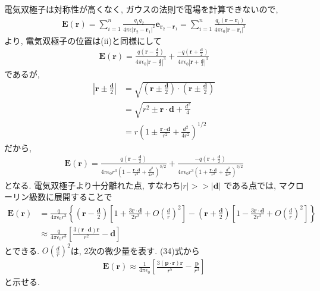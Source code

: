 \documentclass[a4paper,12pt]{jlreq}
\begin{document}
電気双極子は対称性が高くなく, ガウスの法則で電場を計算できないので, 
\begin{align}
  \bm{E}(\bm{r}) = \sum_{i = 1}^{n}\frac{q_1 q_2}{4\pi \epsilon \left|\bm{r}_2 - \bm{r}_1\right|^2} \bm{e}_{\bm{r}_2 - \bm{r}_1} = \sum_{i = 1}^{n} \frac{q_i (\bm{r} - \bm{r}_i)}{4\pi \epsilon_0 \left|\bm{r} - \bm{r}_i\right|^3}
\end{align}
より, 電気双極子の位置は(ii)と同様にして
\begin{align}
  \bm{E}(\bm{r}) = \frac{q\left(\bm{r} - \frac{\bm{d}}{2}\right)}{4\pi \epsilon_0 \left|\bm{r} - \frac{\bm{d}}{2}\right|^3} + \frac{-q\left(\bm{r} + \frac{\bm{d}}{2}\right)}{4\pi \epsilon_0 \left|\bm{r} + \frac{\bm{d}}{2}\right|^3}
\end{align}
であるが, 
\begin{align}
  \left|\bm{r} \pm \frac{\bm{d}}{2}\right| &= \sqrt{\left(\bm{r} \pm \frac{\bm{d}}{2}\right) \cdot \left(\bm{r} \pm \frac{\bm{d}}{2}\right)} \\
  &= \sqrt{r^2 \pm \bm{r \cdot d} + \frac{d^2}{4}}\\
  &= r\left(1 \pm \frac{\bm{r \cdot d}}{r^2} + \frac{d^2}{4r^2}\right)^{1/2}
\end{align}
だから, 
\begin{align}
  \bm{E}(\bm{r}) = \frac{q\left(\bm{r} - \frac{\bm{d}}{2}\right)}{4\pi \epsilon_0 r^3\left(1 - \frac{\bm{r \cdot d}}{r^2} + \frac{d^2}{4r^2}\right)^{3/2}} + \frac{-q\left(\bm{r} + \frac{\bm{d}}{2}\right)}{4\pi \epsilon_0 r^3\left(1 + \frac{\bm{r \cdot d}}{r^2} + \frac{d^2}{4r^2}\right)^{3/2}}
\end{align}
となる. 電気双極子より十分離れた点, すなわち$|r| >> |\bm{d}|$
である点では, マクローリン級数に展開することで
\begin{align}
  \bm{E}(\bm{r}) &= \frac{q}{4\pi \epsilon_0 r^3} \left\{\left(\bm{r} - \frac{\bm{d}}{2}\right)\left[1 + \frac{3\bm{r \cdot d}}{2r^2} + O\left(\frac{d}{r}\right)^2\right] - \left(\bm{r} + \frac{\bm{d}}{2}\right)\left[1 - \frac{3\bm{r \cdot d}}{2r^2} + O\left(\frac{d}{r}\right)^2\right]\right\}\\
  &\approx \frac{q}{4\pi \epsilon_0 r^3} \left[\frac{3(\bm{r \cdot d})\bm{r}}{r^2} - \bm{d}\right]
\end{align}
とできる. $O\left(\frac{d}{r}\right)^2$は, 2次の微少量を表す. 
(34)式から
\begin{align}
  \bm{E}(\bm{r}) \approx \frac{1}{4\pi \epsilon_0}\left[\frac{3(\bm{p \cdot r})\bm{r}}{r^5} - \frac{\bm{p}}{r^3}\right]
\end{align}
と示せる. 
\end{document}

